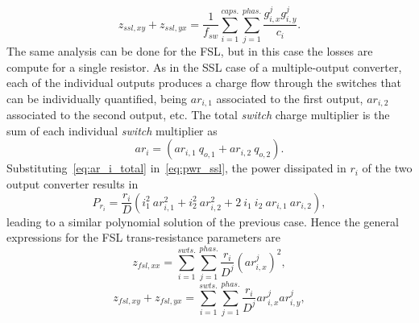 \begin{equation}
  z_{ssl,xy} + z_{ssl,yx} =  \frac{1}{f_{sw}} \sum_{i=1}^{caps.} \sum_{j=1}^{phas.}
  \frac{g_{i,x}^j g_{i,y}^j}{c_i}.
 \label{eq:z_ssl_xy}
\end{equation}
The same analysis can be done for the FSL, but in this case the losses are compute for a single resistor.
As in the SSL case of a multiple-output converter, each of the individual outputs produces a charge flow through the switches that can be individually quantified, being $ar_{i,1}$ associated to the first output, $ar_{i,2}$ associated to the second output, etc. The total \emph{switch} charge multiplier is the sum of each individual \emph{switch} multiplier as
\begin{equation}
 ar_i =  (ar_{i,1} ~ q_{o,1} +  ar_{i,2} ~ q_{o,2}).
 \label{eq:ar_i_total}
\end{equation}
Substituting~\eqref{eq:ar_i_total} in~\eqref{eq:pwr_ssl}, the power dissipated in $r_i$ of the two output converter results in
\begin{equation}
 P_{r_{i}} =  \frac{r_i}{D} (i_1^2 ~ar_{i,1}^2  +  i_2^2 ~ ar_{i,2}^2 + 2 ~ i_{1} ~ i_{2} ~ ar_{i,1}~ar_{i,2}),
 \label{eq:ploss_r_1}
\end{equation}
leading to a similar polynomial solution of the previous case. Hence the general expressions for the FSL trans-resistance parameters are
\begin{equation}
  z_{fsl,xx} =   \sum_{i=1}^{swts.} \sum_{j=1}^{phas.}
  \frac{r_{i}}{D^j} \left ( ar_{i,x}^j \right )^2,
 \label{eq:z_fsl_xx}
\end{equation}
\begin{equation}
  z_{fsl,xy} + z_{fsl,yx} =   \sum_{i=1}^{swts.} \sum_{j=1}^{phas.}
  \frac{r_{i}}{D^j} ar_{i,x}^j ar_{i,y}^j,
 \label{eq:z_fsl_xy}
\end{equation}

